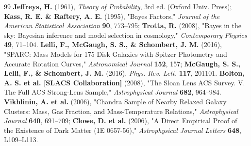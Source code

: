 \documentclass[10pt,a4paper]{article}
\begin{document}
\begin{thebibliography}{99}
 \textbf{Jeffreys, H.} (1961), \textit{Theory of Probability}, 3rd ed. (Oxford Univ. Press); \textbf{Kass, R. E. \& Raftery, A. E.} (1995), "Bayes Factors," \textit{Journal of the American Statistical Association} \textbf{90}, 773–795; \textbf{Trotta, R.} (2008), "Bayes in the sky: Bayesian inference and model selection in cosmology," \textit{Contemporary Physics} \textbf{49}, 71–104.
 \textbf{Lelli, F., McGaugh, S. S., \& Schombert, J. M.} (2016), "SPARC: Mass Models for 175 Disk Galaxies with Spitzer Photometry and Accurate Rotation Curves," \textit{Astronomical Journal} \textbf{152}, 157; \textbf{McGaugh, S. S., Lelli, F., \& Schombert, J. M.} (2016), \textit{Phys. Rev. Lett.} \textbf{117}, 201101.
 \textbf{Bolton, A. S. et al. [SLACS Collaboration]} (2008), "The Sloan Lens ACS Survey. V. The Full ACS Strong-Lens Sample," \textit{Astrophysical Journal} \textbf{682}, 964–984.
 \textbf{Vikhlinin, A. et al.} (2006), "Chandra Sample of Nearby Relaxed Galaxy Clusters: Mass, Gas Fraction, and Mass-Temperature Relations," \textit{Astrophysical Journal} \textbf{640}, 691–709; \textbf{Clowe, D. et al.} (2006), "A Direct Empirical Proof of the Existence of Dark Matter (1E 0657-56)," \textit{Astrophysical Journal Letters} \textbf{648}, L109–L113.
\end{thebibliography}
\end{document}

